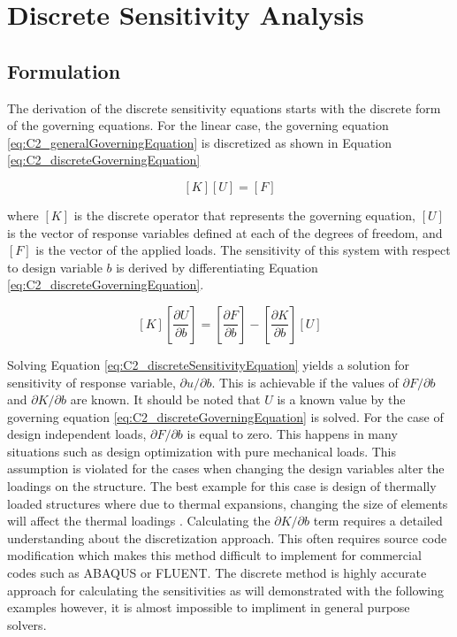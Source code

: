 \section{Discrete Sensitivity Analysis}
\subsection{Formulation}
The derivation of the discrete sensitivity equations starts with the discrete form of the governing equations. For the linear case, the governing equation \eqref{eq:C2_generalGoverningEquation} is discretized as shown in Equation \eqref{eq:C2_discreteGoverningEquation}

\begin{equation}\label{eq:C2_discreteGoverningEquation}
	\left[ K \right] \left[ U \right] = \left[ F \right]
\end{equation}

where $[K]$ is the discrete operator that represents the governing equation, $[U]$ is the vector of response variables defined at each of the degrees of freedom, and $[F]$ is the vector of the applied loads. The sensitivity of this system with respect to design variable $b$ is derived by differentiating Equation \eqref{eq:C2_discreteGoverningEquation}.

\begin{equation}\label{eq:C2_discreteSensitivityEquation}
	\left[ K \right] \left[ \frac{\partial U}{\partial b} \right] = 
	\left[ \frac{\partial F}{\partial b} \right] - 
	\left[ \frac{\partial K}{\partial b} \right] \left[ U \right]
\end{equation}

Solving Equation \eqref{eq:C2_discreteSensitivityEquation} yields a solution for sensitivity of response variable, $\partial u/\partial b$. This is achievable if the values of $\partial F/\partial b$ and $\partial K/\partial b$ are known. It should be noted that $U$ is a known value by the governing equation \eqref{eq:C2_discreteGoverningEquation} is solved. For the case of design independent loads, $\partial F/\partial b$ is equal to zero. This happens in many situations such as design optimization with pure mechanical loads. This assumption is violated for the cases when changing the design variables alter the loadings on the structure. The best example for this case is design of thermally loaded structures where due to thermal expansions, changing the size of elements will affect the thermal loadings \cite{deaton2013stiffening}. Calculating the $\partial K/\partial b$ term requires a detailed understanding about the discretization approach. This often requires source code modification which makes this method difficult to implement for commercial codes such as ABAQUS or FLUENT. The discrete method is highly accurate approach for calculating the sensitivities as will demonstrated with the following examples however, it is almost impossible to impliment in general purpose solvers.

